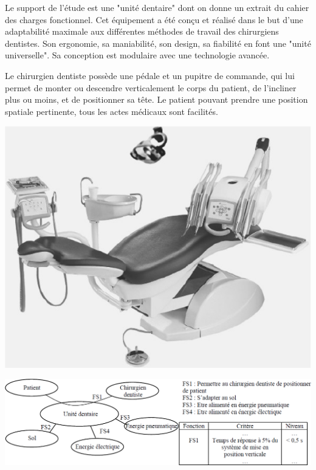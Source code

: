 \documentclass[11pt,oneside]{article}
\begin{document}
\begin{minipage}[c]{.6\linewidth}
Le support de l'étude est une "unité dentaire" dont on donne un extrait du cahier des charges fonctionnel. Cet équipement a été conçu et réalisé dans le but d'une adaptabilité maximale aux différentes méthodes de travail des chirurgiens dentistes. Son ergonomie, sa maniabilité, son design, sa fiabilité en font une "unité universelle". Sa conception est modulaire avec une technologie avancée.

Le chirurgien dentiste possède une pédale et un pupitre de commande, qui lui permet de monter ou descendre verticalement le corps du patient, de l'incliner plus ou moins, et de positionner sa tête. Le patient pouvant prendre une position spatiale pertinente, tous les actes médicaux sont facilités.
\end{minipage}\hfill
\begin{minipage}[c]{.35\linewidth}
\begin{center}
\includegraphics[width=.9\textwidth]{png/fig1}
\end{center}
\end{minipage}

\begin{center}
\includegraphics[width=.9\textwidth]{png/fig2}
\end{center}
\end{document}
